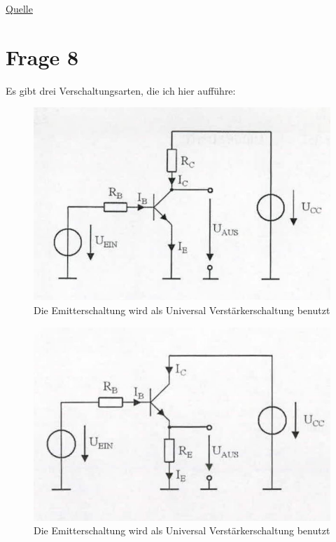 \href{http://de.wikipedia.org/wiki/Bipolartransistor#Ausf.C3.BChrungsbeispiele}{Quelle}


\section{Frage 8}

Es gibt drei Verschaltungsarten, die ich hier aufführe:

\begin{figure}[h]
	\centering
	\includegraphics[scale=0.5]{Emitterschaltung.jpg}
	\caption{Die Emitterschaltung wird als Universal Verstärkerschaltung benutzt}
\end{figure}


\begin{figure}[h]
	\centering
	\includegraphics[scale=0.5]{Kollektorschaltung.jpg}
	\caption{Die Emitterschaltung wird als Universal Verstärkerschaltung benutzt}
\end{figure}

